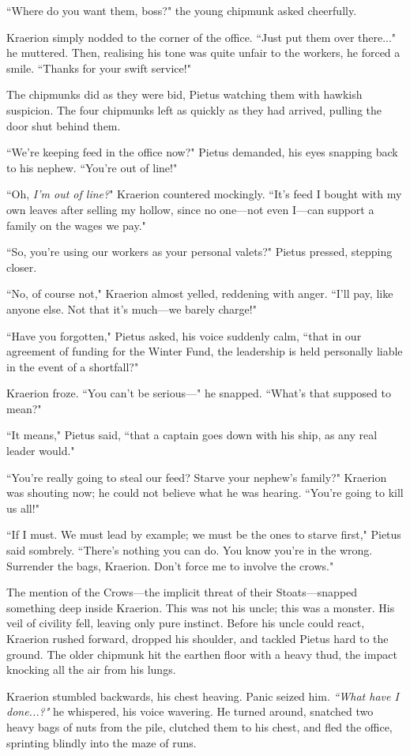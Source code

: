 ``Where do you want them, boss?" the young chipmunk asked cheerfully.

Kraerion simply nodded to the corner of the office.
``Just put them over there..." he muttered.
Then, realising his tone was quite unfair to the workers, he forced a smile.
``Thanks for your swift service!"

The chipmunks did as they were bid, Pietus watching them with hawkish suspicion.
The four chipmunks left as quickly as they had arrived, pulling the door shut behind them.

``We're keeping feed in the office now?" Pietus demanded, his eyes snapping back to his nephew.
``You're out of line!"

``Oh, \textit{I'm out of line?}" Kraerion countered mockingly.
``It's feed I bought with my own leaves after selling my hollow, since no one---not even I---can support a family on the wages we pay."

``So, you're using our workers as your personal valets?" Pietus pressed, stepping closer.

``No, of course not," Kraerion almost yelled, reddening with anger.
``I'll pay, like anyone else.
Not that it's much---we barely charge!"

``Have you forgotten," Pietus asked, his voice suddenly calm, ``that in our agreement of funding for the Winter Fund, the leadership is held personally liable in the event of a shortfall?"

Kraerion froze.
``You can't be serious---" he snapped.
``What's that supposed to mean?"

``It means," Pietus said, ``that a captain goes down with his ship, as any real leader would."

``You're really going to steal our feed?
Starve your nephew's family?" Kraerion was shouting now; he could not believe what he was hearing.
``You're going to kill us all!"

``If I must.
We must lead by example; we must be the ones to starve first," Pietus said sombrely.
``There's nothing you can do.
You know you're in the wrong.
Surrender the bags, Kraerion.
Don't force me to involve the crows."

The mention of the Crows---the implicit threat of their Stoats---snapped something deep inside Kraerion.
This was not his uncle; this was a monster.
His veil of civility fell, leaving only pure instinct.
Before his uncle could react, Kraerion rushed forward, dropped his shoulder, and tackled Pietus hard to the ground.
The older chipmunk hit the earthen floor with a heavy thud, the impact knocking all the air from his lungs.

Kraerion stumbled backwards, his chest heaving.
Panic seized him. \textit{``What have I done...?"} he whispered, his voice wavering.
He turned around, snatched two heavy bags of nuts from the pile,  clutched them to his chest, and fled the office, sprinting blindly into the maze of runs.
